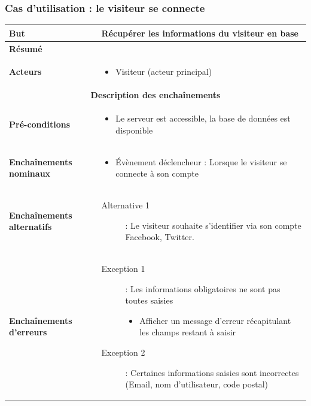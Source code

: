 \documentclass[a4paper,12pt]{report}
\begin{document}
\begin{onehalfspace}
\begin{tabular}{|p{3cm}|p{}|}
\end{tabular}


\subsubsection{Cas d'utilisation : le visiteur se connecte} %

\begin{tabular}{|p{3cm}|p{}|}
\hline %

\textbf{But} &
Récupérer les informations du visiteur en base 
\\ \hline %

\textbf{Résumé} &
\\ \hline %

\textbf{Acteurs} &
\begin{itemize}
  \item Visiteur (acteur principal)
\end{itemize} 
\\ \hline %

\multicolumn{2}{|c|}{\textbf{Description des enchaînements}}
\\ \hline %

\textbf{Pré-conditions} &
    \begin{itemize}
      \item Le serveur est accessible, la base de données est disponible    
    \end{itemize}
\\ \hline %

\textbf{Enchaînements nominaux} &
    \begin{itemize}
      \item Évènement déclencheur : Lorsque le visiteur se connecte à son compte
    \end{itemize}
\\ \hline %

\textbf{Enchaînements alternatifs} &
    \begin{description}
      \item[Alternative 1]: Le visiteur souhaite s’identifier via son compte Facebook, Twitter.
    \end{description}
\\ \hline %

\textbf{Enchaînements d'erreurs} &
  \begin{description}
    \item[Exception 1]: Les informations obligatoires ne sont pas toutes saisies
    \begin{itemize}
      \item Afficher un message d’erreur récapitulant les champs restant à saisir
    \end{itemize}
    \item[Exception 2]: Certaines informations saisies sont incorrectes (Email, nom d’utilisateur, code postal)
  \end{description}
\\ \hline %


\end{tabular}
\end{onehalfspace}
\end{document}
